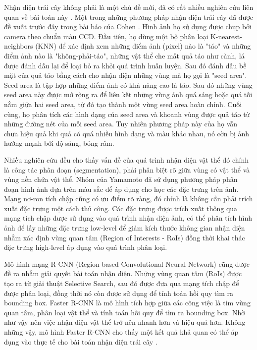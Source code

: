 Nhận diện trái cây không phải là một chủ đề mới, đã có rất nhiều nghiên cứu liên quan về bài toán này \cite{bargoti2017image} \cite{sa2016deepfruits}. Một trong những phương pháp nhận diện trái cây đã được đề xuất trước đây trong bài báo của Cohen \cite{cohen2010estimation}. Hình ảnh họ sử dụng được chụp bởi camera theo chuẩn màu CCD. Đầu tiên, họ dùng một bộ phân loại K-nearest-neighbors (KNN) để xác định xem những điểm ảnh (pixel) nào là "táo" và những điểm ảnh nào là "không-phải-táo", những vật thể che mất quả táo như cành, lá được đánh dấu lại để loại bỏ ra khỏi quá trình huấn luyện. Sau đó đánh dấu bề mặt  của quả táo bằng cách cho nhận diện những vùng mà họ gọi là "seed area". Seed area là tập hợp những điểm ảnh có khả năng cao là táo. Sau đó những vùng seed area này được mở rộng ra để liên kết những vùng ảnh quá sáng hoặc quá tối nằm giữa hai seed area, từ đó tạo thành một vùng seed area hoàn chỉnh. Cuối cùng, họ phân tích các hình dạng của seed area và khoanh vùng được quả táo từ những đường nét của mỗi seed area. Tuy nhiên phương pháp này của họ vẫn chưa hiệu quả khi quả có quá nhiều hình dạng và màu khác nhau, nó cờn bị ảnh hưởng mạnh bởi độ sáng, bóng râm.

Nhiều nghiên cứu đều cho thấy vấn đề của quá trình nhận diện vật thể đó chính là công tác phân đoạn (segmentation), phải phân biệt rõ giữa vùng có vật thể và vùng nền chứa vật thể. Nhóm của Yamamoto \cite{yamamoto2014plant} đã sử dụng phương pháp phân đoạn hình ảnh dựa trên màu sắc để áp dụng cho học các đặc trưng trên ảnh. Mạng nơ-ron tích chập cũng có ưu điểm rõ ràng, đó chính là không cần phải trích xuất đặc trưng một cách thủ công. Các đặc trưng được trích xuất thông qua mạng tích chập được sử dụng vào quá trình nhận diện ảnh, có thể phân tích hình ảnh để lấy những đặc trưng low-level để giảm kích thước không gian nhận diện nhằm xác định vùng quan tâm (Region of Interests - RoIs) đồng thời khai thác đặc trưng high-level áp dụng vào quá trình phân loại.

Mô hình mạng R-CNN (Region based Convolutional Neural Network) cũng được đề ra nhằm giải quyết bài toán nhận diện. Những vùng quan tâm (RoIs) được tạo ra từ giải thuật Selective Search, sau đó được đưa qua mạng tích chập để được phân loại, đồng thời nó còn được sử dụng để tính toán hồi quy tìm ra bounding box. Faster R-CNN là mô hình tích hợp giữa các công việc là tìm vùng quan tâm, phân loại vật thể và tính toán hồi quy để tìm ra bounding box. Nhờ như vậy nên việc nhận diện vật thể trở nên nhanh hơn và hiệu quả hơn. Không những vậy, mô hình Faster R-CNN cho thấy một kết quả khả quan có thể áp dụng vào thực tế cho bài toán nhận diện trái cây \cite{bargoti2017deep}.

